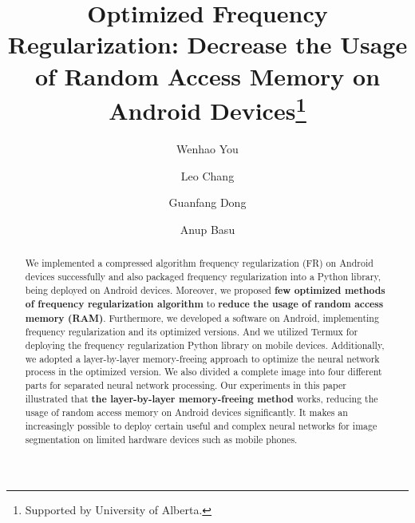 \documentclass[runningheads]{llncs}
\begin{document}
%
\title{Optimized Frequency Regularization: Decrease the Usage of Random Access Memory on Android Devices\thanks{Supported by University of Alberta.}}
%
%
\author{Wenhao You \and
Leo Chang \and
Guanfang Dong \and
Anup Basu}


\def\thefootnote{1}
%
%
%
\maketitle              %
%
\begin{abstract}
We implemented a compressed algorithm frequency regularization (FR) on Android devices successfully and also packaged frequency regularization into a Python library, being deployed on Android devices. Moreover, we proposed \textbf{few optimized methods of frequency regularization algorithm} to \textbf{reduce the usage of random access memory (RAM)}. Furthermore, we developed a software on Android, implementing frequency regularization and its optimized versions. And we utilized Termux for deploying the frequency regularization Python library on mobile devices. Additionally, we adopted a layer-by-layer memory-freeing approach to optimize the neural network process in the optimized version. We also divided a complete image into four different parts for separated neural network processing. Our experiments in this paper illustrated that \textbf{the layer-by-layer memory-freeing method} works, reducing the usage of random access memory on Android devices significantly. It makes an increasingly possible to deploy certain useful and complex neural networks for image segmentation on limited hardware devices such as mobile phones.

\end{abstract}
%
%
%
\end{document}
